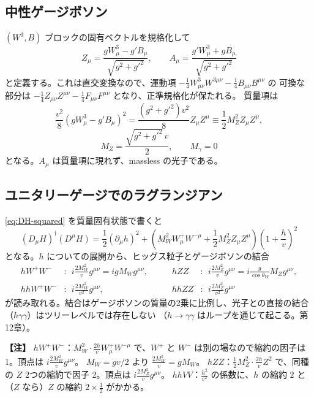 \documentclass[uplatex,dvipdfmx,a4paper,11pt,openany]{jsbook}
\newenvironment{note}{\vspace{1ex}\par\footnotesize\noindent\textbf{【注】}}{\par\vspace{1ex}}
\numberwithin{equation}{chapter}
\theoremstyle{definition}
\theoremstyle{plain}
\theoremstyle{remark}
\begin{document}
\subsection{中性ゲージボソン}
$(W^3,B)$ ブロックの固有ベクトルを規格化して
\begin{equation}
Z_\mu=\frac{gW^3_\mu-g'B_\mu}{\sqrt{g^2+g'^2}},\qquad
A_\mu=\frac{g'W^3_\mu+gB_\mu}{\sqrt{g^2+g'^2}}
\label{eq:Z-A-def}
\end{equation}
と定義する。これは直交変換なので、運動項 $-\frac14W^3_{\mu\nu}W^{3\mu\nu}-\frac14B_{\mu\nu}B^{\mu\nu}$ の
可換な部分は $-\frac14Z_{\mu\nu}Z^{\mu\nu}-\frac14F_{\mu\nu}F^{\mu\nu}$ となり、正準規格化が保たれる。
質量項は
\begin{equation}
\frac{v^2}{8}\left(gW^3_\mu-g'B_\mu\right)^2=\frac{(g^2+g'^2)v^2}{8}Z_\mu Z^\mu\equiv\frac12M_Z^2Z_\mu Z^\mu,
\end{equation}
\begin{equation}
\boxed{M_Z=\frac{\sqrt{g^2+g'^2}\,v}{2},\qquad M_\gamma=0}
\label{eq:MZ}
\end{equation}
となる。$A_\mu$ は質量項に現れず、massless の光子である。
\subsection{ユニタリーゲージでのラグランジアン}
\eqref{eq:DH-squared} を質量固有状態で書くと
\begin{equation}
(D_\mu H)^\dagger(D^\mu H)=\frac12(\partial_\mu h)^2
+\left(M_W^2W^+_\mu W^{-\mu}+\frac12M_Z^2Z_\mu Z^\mu\right)\left(1+\frac hv\right)^2
\label{eq:higgs-gauge-unitary}
\end{equation}
となる。$h$ についての展開から、ヒッグス粒子とゲージボソンの結合
\begin{equation}
\begin{aligned}
hW^+W^-&:\ \ i\frac{2M_W^2}{v}g^{\mu\nu}=igM_Wg^{\mu\nu}, &\qquad
hZZ&:\ \ i\frac{2M_Z^2}{v}g^{\mu\nu}=i\frac{g}{\cos\theta_W}M_Zg^{\mu\nu},\\
hhW^+W^-&:\ \ i\frac{2M_W^2}{v^2}g^{\mu\nu}, &\qquad
hhZZ&:\ \ i\frac{2M_Z^2}{v^2}g^{\mu\nu}
\end{aligned}
\label{eq:hVV-couplings}
\end{equation}
が読み取れる。結合はゲージボソンの質量の2乗に比例し、光子との直接の結合（$h\gamma\gamma$）はツリーレベルでは存在しない
（$h\to\gamma\gamma$ はループを通じて起こる。第12章）。
\begin{note}
$hW^+W^-$：$M_W^2\cdot\frac{2h}{v}W^+_\mu W^{-\mu}$ で、$W^+$ と $W^-$ は別の場なので縮約の因子は 1。頂点は $i\frac{2M_W^2}{v}g^{\mu\nu}$。
$M_W=gv/2$ より $\frac{2M_W^2}{v}=gM_W$。
$hZZ$：$\frac12M_Z^2\cdot\frac{2h}{v}Z^2$ で、同種の $Z$ 2つの縮約で因子 2。頂点は $i\frac{2M_Z^2}{v}g^{\mu\nu}$。
$hhVV$：$\frac{h^2}{v^2}$ の係数に、$h$ の縮約 $2$ と（$Z$ なら）$Z$ の縮約 $2\times\frac12$ がかかる。
\end{note}
\end{document}

